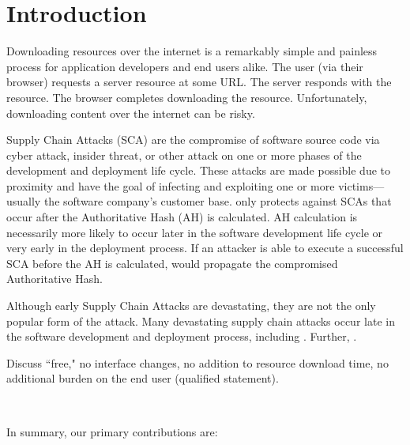 \section{Introduction} \label{sec:introduction}

Downloading resources over the internet is a remarkably simple and painless
process for application developers and end users alike. The user (via their
browser) requests a server resource at some URL. The server responds with the
resource. The browser completes downloading the resource. Unfortunately,
downloading content over the internet can be risky.

Supply Chain Attacks (SCA) are the compromise of software source code via cyber
attack, insider threat, or other attack on one or more phases of the development
and deployment life cycle. These attacks are made possible due to proximity and
have the goal of infecting and exploiting one or more victims---usually the
software company's customer base. \SYSTEM{} only protects against SCAs that
occur after the Authoritative Hash (AH) is calculated. AH calculation is
necessarily more likely to occur later in the software development life cycle or
very early in the deployment process. If an attacker is able to execute a
successful SCA before the AH is calculated, \SYSTEM{} would propagate the
compromised Authoritative Hash.


Although early Supply Chain Attacks are devastating, they are not the only
popular form of the attack. Many devastating supply chain attacks occur late in
the software development and deployment process, including . Further, .

Discuss ``free," \ie no interface changes, no addition to resource download
time, no additional burden on the end user (qualified statement).

~\cite{DNSSEC}

In summary, our primary contributions are:

